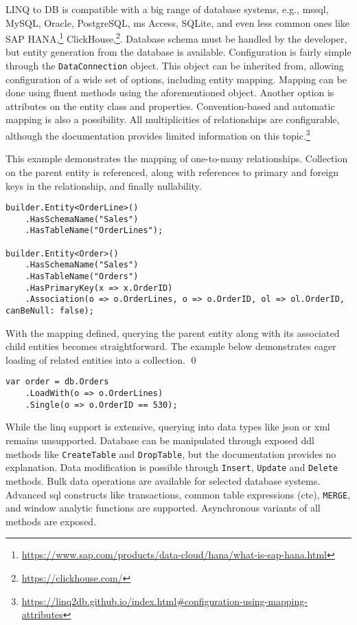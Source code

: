 LINQ to DB is compatible with a big range of database systems, e.g., \acrshort{mssql}, MySQL, Oracle, PostgreSQL, \acrshort{ms} Access, SQLite, and even less common ones like SAP HANA,\footnote{\url{https://www.sap.com/products/data-cloud/hana/what-is-sap-hana.html}} ClickHouse,\footnote{\url{https://clickhouse.com/}}. Database schema must be handled by the developer, but entity generation from the database is available. Configuration is fairly simple through the \texttt{DataConnection} object. This object can be inherited from, allowing configuration of a wide set of options, including entity mapping. Mapping can be done using fluent methods using the aforementioned object. Another option is attributes on the entity class and properties. Convention-based and automatic mapping is also a possibility. All multiplicities of relationships are configurable, although the documentation provides limited information on this topic.\footnote{\url{https://linq2db.github.io/index.html\#configuration-using-mapping-attributes}}

\begin{example}
\small
This example demonstrates the mapping of one-to-many relationships. Collection on the parent entity is referenced, along with references to primary and foreign keys in the relationship, and finally nullability.

\begin{lstlisting}[language=CSharp]
builder.Entity<OrderLine>()
    .HasSchemaName("Sales")
    .HasTableName("OrderLines");

builder.Entity<Order>()
    .HasSchemaName("Sales")
    .HasTableName("Orders")
    .HasPrimaryKey(x => x.OrderID)
    .Association(o => o.OrderLines, o => o.OrderID, ol => ol.OrderID, canBeNull: false);
\end{lstlisting}

\small With the mapping defined, querying the parent entity along with its associated child entities becomes straightforward. The example below demonstrates eager loading of related entities into a collection.
\qed

\begin{lstlisting}[language=CSharp]
var order = db.Orders
    .LoadWith(o => o.OrderLines)
    .Single(o => o.OrderID == 530);
\end{lstlisting}
\end{example}

While the \acrshort{linq} support is extensive, querying into data types like \acrshort{json} or \acrshort{xml} remains unsupported. 
Database can be manipulated through exposed \acrshort{ddl} methods like \texttt{CreateTable} and \texttt{DropTable}, but the documentation provides no explanation. Data modification is possible through \texttt{Insert}, \texttt{Update} and \texttt{Delete} methods. Bulk data operations are available for selected database systems.
Advanced \acrshort{sql} constructs like transactions, common table expressions (\acrshort{cte}), \texttt{MERGE}, and window analytic functions are supported. Asynchronous variants of all methods are exposed.

